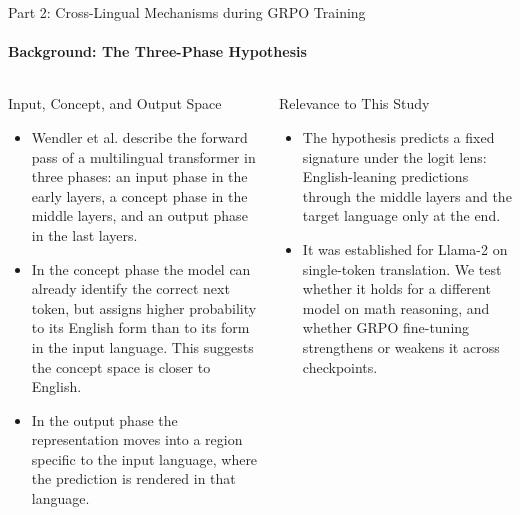 \documentclass[aspectratio=169]{beamer}
\begin{document}
	\begin{frame}{Part 2: Cross-Lingual Mechanisms during GRPO Training}
		\framesubtitle{Background: The Three-Phase Hypothesis}
		\begin{columns}
			\begin{block}{\scriptsize Input, Concept, and Output Space}\scriptsize
				\begin{itemize}
					\item Wendler et al. \autocite{wendler2024llamas} describe the forward pass of a multilingual transformer in three phases: an input phase in the early layers, a concept phase in the middle layers, and an output phase in the last layers.
					\item In the concept phase the model can already identify the correct next token, but assigns higher probability to its English form than to its form in the input language. This suggests the concept space is closer to English.
					\item In the output phase the representation moves into a region specific to the input language, where the prediction is rendered in that language.
				\end{itemize}
			\end{block}
			\begin{block}{\scriptsize Relevance to This Study}\scriptsize
				\begin{itemize}
					\item The hypothesis predicts a fixed signature under the logit lens: English-leaning predictions through the middle layers and the target language only at the end.
					\item It was established for Llama-2 on single-token translation. We test whether it holds for a different model on math reasoning, and whether GRPO fine-tuning strengthens or weakens it across checkpoints.
				\end{itemize}
			\end{block}
		\end{columns}
	\end{frame}
	
\end{document}
